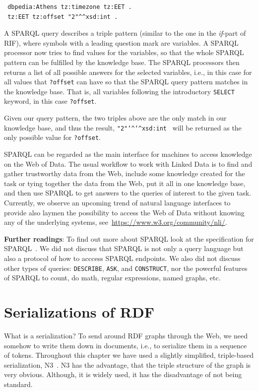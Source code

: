 \begin{verbatim}
 dbpedia:Athens tz:timezone tz:EET .
 tz:EET tz:offset "2"^^xsd:int .
\end{verbatim}

A SPARQL query describes a triple pattern (similar to the one in the \textit{if}-part of RIF),
where symbols with a leading question mark are variables.
A SPARQL processor now tries to find values for the variables, so that the whole SPARQL pattern can be fulfilled by the knowledge base.
The SPARQL processors then returns a list of all possible answers for the selected variables, i.e., in this case for all values that \texttt{?offset} can have so that the SPARQL query pattern matches in the knowledge base.
That is, all variables following the introductory \texttt{SELECT} keyword, in this case \texttt{?offset}.

Given our query pattern, the two triples above are the only match in our knowledge base, and thus the result, \texttt{"2"\texttt{\char`\^}\texttt{\char`\^}xsd:int } will be returned as the only possible value for \texttt{?offset}.

SPARQL can be regarded as the main interface for machines to access knowledge on the Web of Data.
The usual workflow to work with Linked Data is to find and gather trustworthy data from the Web, include some knowledge created for the task or tying together the data from the Web, put it all in one knowledge base, and then use SPARQL to get answers to the queries of interest to the given task.
Currently, we observe an upcoming trend of natural language interfaces to provide also laymen the possibility to access the Web of Data without knowing any of the underlying systems, see~\url{https://www.w3.org/community/nli/}.

\medskip

\textbf{Further readings}:
To find out more about SPARQL look at the specification for SPARQL~\cite{Sparql11query}.
We did not discuss that SPARQL is not only a query language but also a protocol of how to acccess SPARQL endpoints.
We also did not discuss other types of queries: \texttt{DESCRIBE}, \texttt{ASK}, and \texttt{CONSTRUCT}, nor the powerful features of SPARQL to count, do math, regular expressions, named graphs, etc.

\section{Serializations of RDF}
\label{rdfa}
What is a serialization?
To send around RDF graphs through the Web, we need somehow to write them down in documents, i.e., to serialize them in a sequence of tokens.
Throughout this chapter we have used a slightly simplified, triple-based serialization, N3~\cite{n3-tech}.
N3 has the advantage, that the triple structure of the graph is very obvious.
Although, it is widely used, it has the disadvantage of not being standard.

